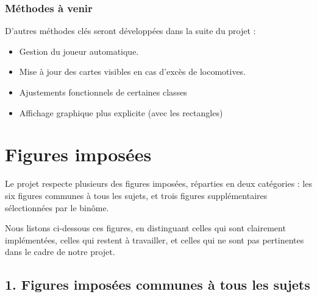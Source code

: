 \documentclass[a4paper,12pt]{report}
\begin{document}
\subsection*{Méthodes à venir}

D'autres méthodes clés seront développées dans la suite du projet :
\begin{itemize}
    \item Gestion du joueur automatique.
    \item Mise à jour des cartes visibles en cas d'excès de locomotives.
    \item Ajustements fonctionnels de certaines classes
    \item Affichage graphique plus explicite (avec les rectangles)
\end{itemize}

\chapter{Figures imposées}

Le projet respecte plusieurs des figures imposées, réparties en deux catégories :
les six figures communes à tous les sujets, et trois figures supplémentaires sélectionnées par le binôme.

Nous listons ci-dessous ces figures, en distinguant celles qui sont clairement implémentées,
celles qui restent à travailler, et celles qui ne sont pas pertinentes dans le cadre de notre projet.

\section*{1. Figures imposées communes à tous les sujets}
\end{document}
